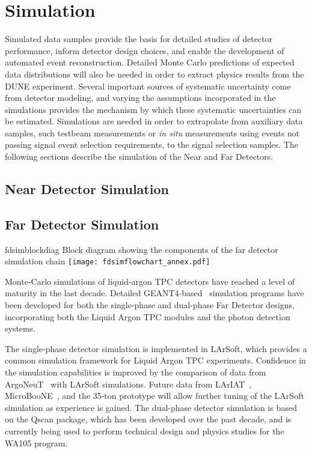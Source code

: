 \chapter{Simulation}
\label{annex:detectors-sc-physics-software-simulation}

Simulated data samples provide the basis for detailed studies of detector performance, inform
detector design choices,  and enable the development of automated event reconstruction.
Detailed Monte Carlo predictions of expected data distributions will also be needed
in order to extract physics results from the DUNE experiment.   Several important sources
of systematic uncertainty come from detector modeling, and varying the assumptions incorporated
in the simulations provides the mechanism by which these systematic uncertainties can be estimated.
Simulations are needed in order
to extrapolate from auxiliary data samples, such testbeam measurements or {\it in situ} measurements
using events not passing signal event selection requirements, to the signal selection samples.
The following sections describe the simulation of the Near and Far Detectors.

\section{Near Detector Simulation}
\label{annex:detectors-sc-physics-software-simulation-nd}


\section{Far Detector Simulation}
\label{annex:detectors-sc-physics-software-simulation-fd}

\begin{cdrfigure}{fdsimblockdiag}
{Block diagram showing the components of the far detector simulation chain}
\texttt{[image: fdsimflowchart\_annex.pdf]}
\end{cdrfigure}

Monte-Carlo simulations of liquid-argon TPC detectors have reached a level of maturity
in the last decade.  Detailed GEANT4-based~\cite{GEANT4:NIM,GEANT4} simulation
programs have been developed  for both the single-phase and dual-phase Far Detector designs,
incorporating both the Liquid Argon TPC modules and the photon detection systems.   

The single-phase detector simulation is implemented in LArSoft,
which provides a common simulation framework for Liquid Argon TPC experiments.
Confidence in the simulation capabilities is improved by
the comparison of data from ArgoNeuT~\cite{Adamson:2013/02/28tla,argoneut-url,Acciarri:2013met} with LArSoft
simulations.  Future data from LArIAT~\cite{Adamson:2013/02/28tla,Cavanna:2014iqa},
MicroBooNE~\cite{Chen:2007ae,Jones:2011ci,microboonecdr}, and the 35-ton prototype will allow
further tuning of the LArSoft simulation as experience is gained.
The dual-phase detector simulation is based on the Qscan package,
which has been developed over the past decade, and is currently
being used to perform technical design and physics studies for
the WA105 program.

